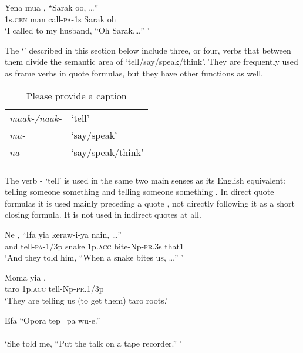 \ea%
\label{ex:3:x311}
\gll Yena mua , ``Sarak oo, {\dots}'' \\
1s.\textsc{gen} man call-\textsc{pa}-1s Sarak oh \\
\glt`I called to my husband, ``Oh Sarak,{\dots}'' '
\z

The `' described in this section below include three, or four, verbs that between them divide the semantic area of `tell/say/speak/think'. They are frequently used as frame verbs in quote formulas, but they have other functions as well.

\begin{table}
\caption{Please provide a caption}
 
\begin{tabular}{>{\itshape}ll}
\mytoprule
maak-/naak- &`tell'\\
ma- &`say/speak'\\
na- &`say/speak/think'\\
\mybottomrule
\end{tabular}

\end{table}

The verb - `tell' is used in the same two main senses as its English equivalent: telling someone  something  and telling someone  something . In direct quote formulas it is used mainly preceding a quote , not directly following it as a short closing formula. It is not used in indirect quotes at all.

\ea%
\label{ex:3:x312}
\gll Ne , ``Ifa yia keraw-i-ya nain, {\dots''} \\
and tell-\textsc{pa}-1/3p snake 1p.\textsc{acc} bite-Np-\textsc{pr}.3s that1\\
\glt`And they told him, ``When a snake bites us, {\dots}'' '
\z

\ea%
\label{ex:3:x313}
\gll Moma yia . \\
taro 1p.\textsc{acc} tell-Np-\textsc{pr}.1/3p \\
\glt`They are telling us (to get them) taro roots.'
\z

\ea%
\label{ex:3:x314}
\gll Efa\textstyleFreeTranslationChar{ } \textstyleFreeTranslationChar{, } ``Opora tep=pa wu-e.'' \\
\\
\glt`She told me, ``Put the talk on a tape recorder.'' '
\z

